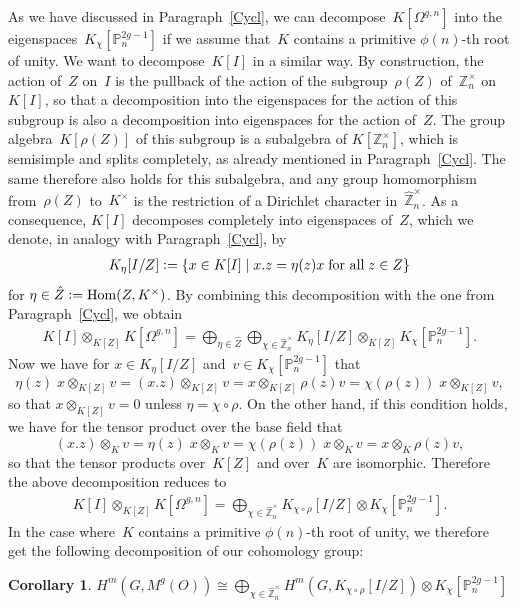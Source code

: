 \documentclass[12pt]{article}
\theoremstyle{definition}
\newtheorem{Cor}[Satz]{Corollary}
\theoremstyle{break}
\newcommand{\Z}{\mathbb{Z}}
\DeclareMathOperator\Hom{Hom}
\renewcommand{\P}{\mathbb{P}}
\renewcommand{\1}{\mathbbm{1}}
\renewcommand{\P}{\mathbb{P}}
\newcommand{\ot}{\mathbin{\otimes}}
\newcommand{\deq}{\vcentcolon =}
\begin{document}
As we have discussed in Paragraph~\ref{Cycl}, we can decompose~$K[\Omega^{g,n}]$ into the eigen\-spaces~$K_\chi[\P^{2g-1}_n]$ if we assume that~$K$ contains a primitive $\phi(n)$-th root of unity. We want to decompose~$K[I]$ in a similar way. By construction, the action of~$Z$ on~$I$ is the pullback of the action of the subgroup~$\rho(Z)$ of~$\Z_n^\times$ on~$K[I]$, so that a decomposition into the eigenspaces for the action of this subgroup is also a decomposition into eigenspaces for the action of~$Z$. The group algebra~$K[\rho(Z)]$ of this subgroup is a subalgebra of
$K[\Z_n^\times]$, which is semisimple and splits completely, as already mentioned in Paragraph~\ref{Cycl}. The same therefore also holds for this subalgebra, and any group homomorphism from~$\rho(Z)$ to~$K^\times$ is the restriction of a Dirichlet character in~$\hat{\Z}_n^\times$. As a consequence, $K[I]$ decomposes completely into eigenspaces of~$Z$, which we denote, in analogy with Paragraph~\ref{Cycl}, by
\begin{align*}
K_\eta[I/Z] \deq
\{x \in K[I]\mid x.z = \eta(z) x \; \text{for all} \;  z \in Z\}
\end{align*}
for $\eta \in \hat{Z} \deq \Hom(Z,K^\times)$. By combining this decomposition with the one from Paragraph~\ref{Cycl}, we obtain
\begin{align*}
K[I] \ot_{K[Z]} K[\Omega^{g,n}]
= \bigoplus_{\eta \in \hat{Z}} \bigoplus_{\chi \in \hat{\Z}_n^\times}
K_\eta[I/Z] \ot_{K[Z]} K_\chi[\P_n^{2g-1}].
\end{align*}
Now we have for $x \in K_\eta[I/Z]$ and~$v \in K_\chi[\P_n^{2g-1}]$ that
\[\eta(z) \; x \ot_{K[Z]} v = (x.z) \ot_{K[Z]} v = x \ot_{K[Z]} \rho(z) v =
\chi(\rho(z)) \; x \ot_{K[Z]} v,\]
so that $x \ot_{K[Z]} v = 0$ unless $\eta = \chi \circ \rho$. On the other hand, if this condition holds, we have for the tensor product over the base field that
\[(x.z) \ot_K v = \eta(z) \; x \ot_K v =
\chi(\rho(z)) \; x \ot_K v  = x \ot_K \rho(z) v, \]
so that the tensor products over~$K[Z]$ and over~$K$ are isomorphic. Therefore the above decomposition reduces to
\begin{align*}
K[I] \ot_{K[Z]} K[\Omega^{g,n}]
= \bigoplus_{\chi \in \hat{\Z}_n^\times}
K_{\chi \circ \rho}[I/Z] \ot K_\chi[\P_n^{2g-1}].
\end{align*}
In the case where~$K$ contains a primitive $\phi(n)$-th root of unity, we therefore get the following decomposition of our cohomology group:
\begin{Cor} \label{DecompCohEig}
$\displaystyle
H^m(G,M^g(O)) \cong
\bigoplus_{\chi \in \hat{\Z}_n^\times}
H^m(G,K_{\chi \circ \rho}[I/Z]) \ot K_\chi[\P_n^{2g-1}]$
\end{Cor}
\end{document}
